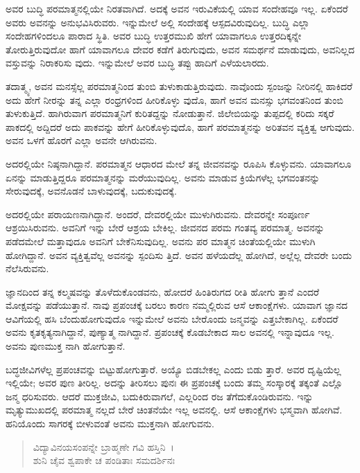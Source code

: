 ಅವರ ಬುದ್ಧಿ ಪರಮಾತ್ಮನಲ್ಲಿಯೇ ನಿರತವಾಗಿದೆ. ಅದಕ್ಕೆ ಅವನ ಇರುವಿಕೆಯಲ್ಲಿ ಯಾವ ಸಂದೇಹವೂ ಇಲ್ಲ. ಏಕೆಂದರೆ ಅವರು ಅವನನ್ನು ಅನುಭವಿಸಿರುವರು. ಇನ್ನುಮೇಲೆ ಅಲ್ಲಿ ಸಂದೇಹಕ್ಕೆ ಆಸ್ಪದವಿರುವುದಿಲ್ಲ. ಬುದ್ಧಿ ಎಲ್ಲಾ ಸಂದೇಹಗಳಿಂದಲೂ ಪಾರಾದ ಸ್ಥಿತಿ. ಅವರ ಬುದ್ಧಿ ಉತ್ತರಮುಖಿ ಹೇಗೆ ಯಾವಾಗಲೂ ಉತ್ತರದಿಕ್ಕನ್ನೇ ತೋರುತ್ತಿರುವುದೋ ಹಾಗೆ ಯಾವಾಗಲೂ ದೇವರ ಕಡೆಗೆ ತಿರುಗುವುದು, ಅವನ ಸಮರ್ಥನೆ ಮಾಡುವುದು, ಅವನಿಲ್ಲದ ವಸ್ತುವನ್ನು ನಿರಾಕರಿಸು ವುದು. ಇನ್ನುಮೇಲೆ ಅವರ ಬುದ್ಧಿ ತಪ್ಪು ಹಾದಿಗೆ ಎಳೆಯಲಾರದು.

ತದಾತ್ಮ್ಯ, ಅವನ ಮನಸ್ಸೆಲ್ಲ ಪರಮಾತ್ಮನಿಂದ ತುಂಬಿ ತುಳುಕಾಡುತ್ತಿರುವುದು. ನಾವೊಂದು ಸ್ಪಂಜನ್ನು ನೀರಿನಲ್ಲಿ ಹಾಕಿದರೆ ಅದು ಹೇಗೆ ನೀರನ್ನು ತನ್ನ ಎಲ್ಲಾ ರಂಧ್ರಗಳಿಂದ ಹೀರಿಕೊಳ್ಳು ವುದೊ, ಹಾಗೆ ಅವನ ಮನಸ್ಸು ಭಗವಂತನಿಂದ ತುಂಬಿ ತುಳುಕುತ್ತಿದೆ. ಹಾಗಿರುವಾಗ ಪರಮಾತ್ಮನಿಗೆ ಕುರಿತದ್ದನ್ನು ನೋಡುತ್ತಾನೆ. ಜಿಲೇಬಿಯನ್ನು ತುಪ್ಪದಲ್ಲಿ ಕರಿದು ಸಕ್ಕರೆ ಪಾಕದಲ್ಲಿ ಅದ್ದಿದರೆ ಅದು ಪಾಕವನ್ನು ಹೇಗೆ ಹೀರಿಕೊಳ್ಳುವುದೊ, ಹಾಗೆ ಪರಮಾತ್ಮನನ್ನು ಅರಿತವನ ವ್ಯಕ್ತಿತ್ವ ಆಗುವುದು. ಅವನ ಒಳಗೆ ಹೊರಗೆ ಎಲ್ಲಾ ಅವನೇ ಆಗಿರುವನು.

ಅದರಲ್ಲಿಯೇ ನಿಷ್ಠನಾಗಿದ್ದಾನೆ. ಪರಮಾತ್ಮನ ಆಧಾರದ ಮೇಲೆ ತನ್ನ ಜೀವನವನ್ನು ರೂಪಿಸಿ ಕೊಳ್ಳುವನು. ಯಾವಾಗಲೂ ಏನನ್ನು ಮಾಡುತ್ತಿದ್ದರೂ ಪರಮಾತ್ಮನನ್ನು ಮರೆಯುವುದಿಲ್ಲ. ಅವನು ಮಾಡುವ ಕ್ರಿಯೆಗಳೆಲ್ಲ ಭಗವಂತನನ್ನು ಸೇರುವುದಕ್ಕೆ, ಅವನೊಡನೆ ಬಾಳುವುದಕ್ಕೆ, ಬದುಕುವುದಕ್ಕೆ.

ಅದರಲ್ಲಿಯೇ ಪರಾಯಣನಾಗಿದ್ದಾನೆ. ಅಂದರೆ, ದೇವರಲ್ಲಿಯೇ ಮುಳುಗಿರುವನು. ದೇವರನ್ನೇ ಸಂಪೂರ್ಣ ಆಶ್ರಯಿಸಿರುವನು. ಅವನಿಗೆ ಇನ್ನು ಬೇರೆ ಆಶ್ರಯ ಬೇಕಿಲ್ಲ. ಜೀವನದ ಪರಮ ಗಂತವ್ಯ ಪರಮಾತ್ಮ. ಅವನನ್ನು ಪಡೆದಮೇಲೆ ಮತ್ತಾವುದೂ ಅವನಿಗೆ ಬೇಕೆನಿಸುವುದಿಲ್ಲ. ಅವನು ಪರ ಮಾತ್ಮನ ಚಿಂತೆಯಲ್ಲಿಯೇ ಮುಳುಗಿ ಹೋಗಿದ್ದಾನೆ. ಅವನ ವ್ಯಕ್ತಿತ್ವವೆಲ್ಲ ಅವನನ್ನು ಸ್ಪಂದಿಸು ತ್ತಿದೆ. ಅವನ ಹಳೆಯದೆಲ್ಲ ಹೋಗಿದೆ, ಅಲ್ಲೆಲ್ಲ ದೇವರೇ ಬಂದು ನೆಲೆಸಿರುವನು.

ಜ್ಞಾನದಿಂದ ತನ್ನ ಕಲ್ಮಷವನ್ನು ತೊಳೆದುಕೊಂಡವನು, ಹೋದರೆ ಹಿಂತಿರುಗದ ರೀತಿ ಹೋಗು ತ್ತಾನೆ ಎಂದರೆ ಮೋಕ್ಷವನ್ನು ಪಡೆಯುತ್ತಾನೆ. ನಾವು ಪ್ರಪಂಚಕ್ಕೆ ಬರಲು ಕಾರಣ ನಮ್ಮಲ್ಲಿರುವ ಆಸೆ ಆಕಾಂಕ್ಷೆಗಳು. ಯಾವಾಗ ಜ್ಞಾನದ ಆವಿಗೆಯಲ್ಲಿ ಹಸಿ ಬೆಂದುಹೋಗುವುದೊ ಇನ್ನುಮೇಲೆ ಅವನು ಬೇರೊಂದು ಜನ್ಮವನ್ನು ಎತ್ತಬೇಕಾಗಿಲ್ಲ. ಏಕೆಂದರೆ ಅವನು ಕೃತಕೃತ್ಯನಾಗಿದ್ದಾನೆ, ಪುಣ್ಯಾತ್ಮ ನಾಗಿದ್ದಾನೆ. ಪ್ರಪಂಚಕ್ಕೆ ಕೊಡಬೇಕಾದ ಸಾಲ ಅವನಲ್ಲಿ ಇನ್ನಾವುದೂ ಇಲ್ಲ. ಅವನು ಪುಣಮುಕ್ತ ನಾಗಿ ಹೋಗುತ್ತಾನೆ.

ಬದ್ಧಜೀವಿಗಳೆಲ್ಲ ಪ್ರಪಂಚವನ್ನು ಬಿಟ್ಟುಹೋಗುತ್ತಾರೆ. ಅಯ್ಯೊ ಬಿಡಬೇಕಲ್ಲ ಎಂದು ಬಿಡು ತ್ತಾರೆ. ಅವರ ದೃಷ್ಟಿಯೆಲ್ಲ ಇಲ್ಲಿಯೇ; ಅವರ ಪುಣ ತೀರಿಲ್ಲ. ಅದನ್ನು ತೀರಿಸಲು ಪುನಃ ಈ ಪ್ರಪಂಚಕ್ಕೆ ಬಂದು ತಮ್ಮ ಸಂಸ್ಕಾರಕ್ಕೆ ತಕ್ಕಂತೆ ಎಲ್ಲೊ ಜನ್ಮ ಧರಿಸುವರು. ಆದರೆ ಮುಕ್ತಜೀವಿ, ಬದುಕಿರುವಾಗಲೆ, ಎಲ್ಲರಿಂದ ರಜ ತೆಗೆದುಕೊಂಡಿರುವನು. ಇನ್ನು ಮೃತ್ಯುಮುಖದಲ್ಲಿ ಪರಮಾತ್ಮ ನಲ್ಲದೆ ಬೇರೆ ಚಿಂತನೆಯೇ ಇಲ್ಲ ಅವನಲ್ಲಿ. ಆಸೆ ಆಕಾಂಕ್ಷೆಗಳು ಭಸ್ಮವಾಗಿ ಹೋಗಿವೆ. ಹನಿಯೊಂದು ಸಾಗರಕ್ಕೆ ಬೀಳುವಂತೆ ಅವನು ಮುಕ್ತನಾಗಿ ಹೋಗುವನು.

\begin{verse}
ವಿದ್ಯಾವಿನಯಸಂಪನ್ನೇ ಬ್ರಾಹ್ಮಣೇ ಗವಿ ಹಸ್ತಿನಿ~।\\ಶುನಿ ಚೈವ ಶ್ವಪಾಕೇ ಚ ಪಂಡಿತಾಃ ಸಮದರ್ಶಿನಃ 
\end{verse}

